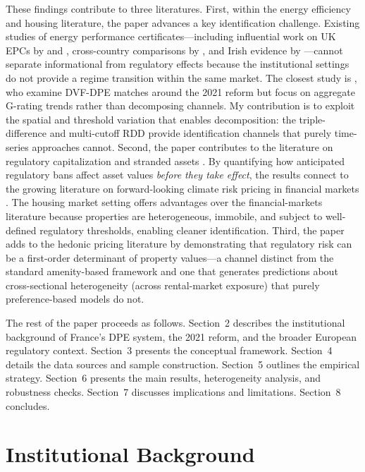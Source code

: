 \documentclass[12pt]{article}
\begin{document}
These findings contribute to three literatures. First, within the energy efficiency and housing literature, the paper advances a key identification challenge. Existing studies of energy performance certificates---including influential work on UK EPCs by \citet{fuerst2015does} and \citet{aydin2020capitalization}, cross-country comparisons by \citet{brounen2013energy}, and Irish evidence by \citet{hyland2013value}---cannot separate informational from regulatory effects because the institutional settings do not provide a regime transition within the same market. The closest study is \citet{garel2025passoires}, who examine DVF-DPE matches around the 2021 reform but focus on aggregate G-rating trends rather than decomposing channels. My contribution is to exploit the spatial and threshold variation that enables decomposition: the triple-difference and multi-cutoff RDD provide identification channels that purely time-series approaches cannot. Second, the paper contributes to the literature on regulatory capitalization and stranded assets \citep{sallee2024stranded, harding2024climate}. By quantifying how anticipated regulatory bans affect asset values \textit{before they take effect}, the results connect to the growing literature on forward-looking climate risk pricing in financial markets \citep{bernstein2019disaster, giglio2021climate, painter2020stranded}. The housing market setting offers advantages over the financial-markets literature because properties are heterogeneous, immobile, and subject to well-defined regulatory thresholds, enabling cleaner identification. Third, the paper adds to the hedonic pricing literature \citep{rosen1974hedonic} by demonstrating that regulatory risk can be a first-order determinant of property values---a channel distinct from the standard amenity-based framework and one that generates predictions about cross-sectional heterogeneity (across rental-market exposure) that purely preference-based models do not.

The rest of the paper proceeds as follows. Section~2 describes the institutional background of France's DPE system, the 2021 reform, and the broader European regulatory context. Section~3 presents the conceptual framework. Section~4 details the data sources and sample construction. Section~5 outlines the empirical strategy. Section~6 presents the main results, heterogeneity analysis, and robustness checks. Section~7 discusses implications and limitations. Section~8 concludes.


\section{Institutional Background}
\end{document}
